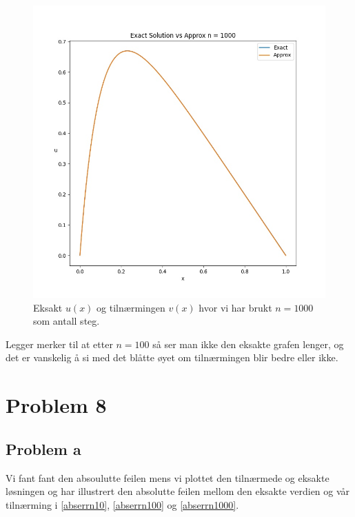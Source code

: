 \documentclass[english,notitlepage]{revtex4-1}  %
\begin{document}
\begin{figure}[h]
\centering
\includegraphics[scale=0.60]{Images/problem7NEW1000.jpg}
\caption{Eksakt $u(x)$ og tilnærmingen $v(x)$ hvor vi har brukt $n = 1000$ som antall steg.}
\label{7n1000}
\end{figure}

Legger merker til at etter $n = 100$ så ser man ikke den eksakte grafen lenger, og det er vanskelig å si med det blåtte øyet om tilnærmingen blir bedre eller ikke.


\section*{Problem 8}

\subsection*{Problem a}
Vi fant fant den absoulutte feilen mens vi plottet den tilnærmede og eksakte løsningen og har illustrert den absolutte feilen mellom den eksakte verdien og vår tilnærming i \ref{abserrn10}, \ref{abserrn100} og \ref{abserrn1000}.
\end{document}
